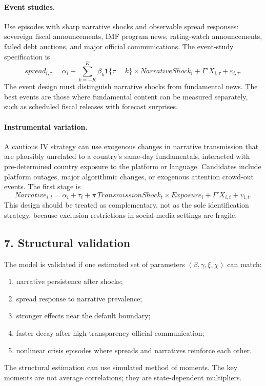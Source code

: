 \documentclass[11pt]{article}
\newcommand{\one}{\mathbf{1}}
\begin{document}
\paragraph{Event studies.} Use episodes with sharp narrative shocks and observable spread responses: sovereign fiscal announcements, IMF program news, rating-watch announcements, failed debt auctions, and major official communications. The event-study specification is
\begin{equation}
spread_{i,\tau}=\alpha_i+\sum_{k=-K}^{K}\beta_k\one\{\tau=k\}\times NarrativeShock_i+\Gamma'X_{i,\tau}+\varepsilon_{i,\tau}. \label{eq:event}
\end{equation}
The event design must distinguish narrative shocks from fundamental news. The best events are those where fundamental content can be measured separately, such as scheduled fiscal releases with forecast surprises.

\paragraph{Instrumental variation.} A cautious IV strategy can use exogenous changes in narrative transmission that are plausibly unrelated to a country's same-day fundamentals, interacted with pre-determined country exposure to the platform or language. Candidates include platform outages, major algorithmic changes, or exogenous attention crowd-out events. The first stage is
\begin{equation}
Narrative_{i,t}=\alpha_i+\tau_t+\pi\,TransmissionShock_t\times Exposure_i+\Gamma'X_{i,t}+v_{i,t}. \label{eq:firststage}
\end{equation}
This design should be treated as complementary, not as the sole identification strategy, because exclusion restrictions in social-media settings are fragile.

\subsection*{7. Structural validation}
The model is validated if one estimated set of parameters $(\beta,\gamma,\xi,\chi)$ can match:
\begin{enumerate}[label=(\roman*)]
\item narrative persistence after shocks;
\item spread response to narrative prevalence;
\item stronger effects near the default boundary;
\item faster decay after high-transparency official communication;
\item nonlinear crisis episodes where spreads and narratives reinforce each other.
\end{enumerate}
The structural estimation can use simulated method of moments. The key moments are not average correlations; they are state-dependent multipliers.
\end{document}
